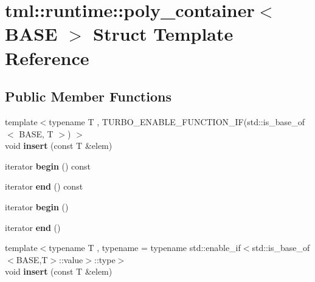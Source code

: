 \hypertarget{structtml_1_1runtime_1_1poly__container}{\section{tml\+:\+:runtime\+:\+:poly\+\_\+container$<$ B\+A\+S\+E $>$ Struct Template Reference}
\label{structtml_1_1runtime_1_1poly__container}
}
\subsection*{Public Member Functions}
\begin{DoxyCompactItemize}
\item 
\hypertarget{structtml_1_1runtime_1_1poly__container_ad90f3962cba7ef559f7a1702c456bd4d}{{\footnotesize template$<$typename T , T\+U\+R\+B\+O\+\_\+\+E\+N\+A\+B\+L\+E\+\_\+\+F\+U\+N\+C\+T\+I\+O\+N\+\_\+\+I\+F(std\+::is\+\_\+base\+\_\+of$<$ B\+A\+S\+E, T $>$) $>$ }\\void {\bfseries insert} (const T \&elem)}\label{structtml_1_1runtime_1_1poly__container_ad90f3962cba7ef559f7a1702c456bd4d}

\item 
\hypertarget{structtml_1_1runtime_1_1poly__container_a86182337dc8efa2eb0c70fb33cafaea8}{iterator {\bfseries begin} () const }\label{structtml_1_1runtime_1_1poly__container_a86182337dc8efa2eb0c70fb33cafaea8}

\item 
\hypertarget{structtml_1_1runtime_1_1poly__container_a4e7b393130762aafc42796e4cbd2c87d}{iterator {\bfseries end} () const }\label{structtml_1_1runtime_1_1poly__container_a4e7b393130762aafc42796e4cbd2c87d}

\item 
\hypertarget{structtml_1_1runtime_1_1poly__container_ab0a92141bafe2619269d1d35913e16b9}{iterator {\bfseries begin} ()}\label{structtml_1_1runtime_1_1poly__container_ab0a92141bafe2619269d1d35913e16b9}

\item 
\hypertarget{structtml_1_1runtime_1_1poly__container_a70bfb6ca4a48aa83aff52035f6ee3ac9}{iterator {\bfseries end} ()}\label{structtml_1_1runtime_1_1poly__container_a70bfb6ca4a48aa83aff52035f6ee3ac9}

\item 
\hypertarget{structtml_1_1runtime_1_1poly__container_ad90f3962cba7ef559f7a1702c456bd4d}{{\footnotesize template$<$typename T , typename  = typename std\+::enable\+\_\+if$<$std\+::is\+\_\+base\+\_\+of$<$\+B\+A\+S\+E,\+T$>$\+::value$>$\+::type$>$ }\\void {\bfseries insert} (const T \&elem)}\label{structtml_1_1runtime_1_1poly__container_ad90f3962cba7ef559f7a1702c456bd4d}


\end{DoxyCompactItemize}
